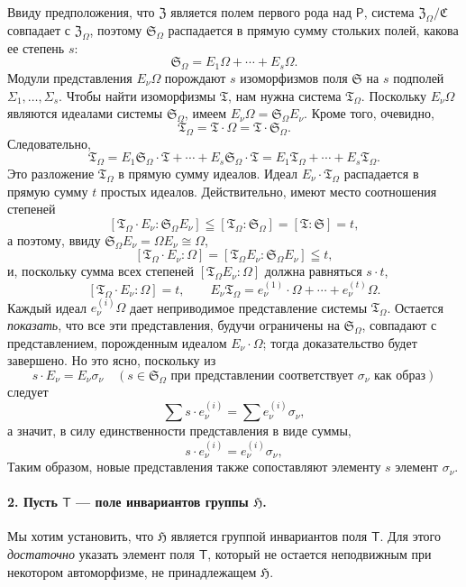 \documentclass[11pt]{article}
\begin{document}
Ввиду предположения, что \(\mathfrak Z\) является полем первого рода над \(\mathsf P\), система \(\mathfrak Z_\Omega/\mathfrak C\) совпадает с \(\mathfrak Z_\Omega\), поэтому \(\mathfrak S_\Omega\) распадается в прямую сумму стольких полей, какова ее степень \(s\):
\[
\mathfrak S_\Omega = E_1\Omega+\cdots+E_s\Omega .
\]
Модули представления \(E_\nu\Omega\) порождают \(s\) изоморфизмов поля \(\mathfrak S\) на \(s\) подполей \(\Sigma_1,\ldots,\Sigma_s\). Чтобы найти изоморфизмы \(\mathfrak T\), нам нужна система \(\mathfrak T_\Omega\). Поскольку \(E_\nu\Omega\) являются идеалами системы \(\mathfrak S_\Omega\), имеем \(E_\nu\Omega=\mathfrak S_\Omega E_\nu\). Кроме того, очевидно,
\[
\mathfrak T_\Omega=\mathfrak T\cdot\Omega=\mathfrak T\cdot\mathfrak S_\Omega .
\]
Следовательно,
\[
\mathfrak T_\Omega
=E_1\mathfrak S_\Omega\cdot\mathfrak T+\cdots+E_s\mathfrak S_\Omega\cdot\mathfrak T
=E_1\mathfrak T_\Omega+\cdots+E_s\mathfrak T_\Omega .
\]
Это разложение \(\mathfrak T_\Omega\) в прямую сумму идеалов. Идеал \(E_\nu\cdot\mathfrak T_\Omega\) распадается в прямую сумму \(t\) простых идеалов. Действительно, имеют место соотношения степеней
\[
[\mathfrak T_\Omega\cdot E_\nu:\mathfrak S_\Omega E_\nu]
\leqq [\mathfrak T_\Omega:\mathfrak S_\Omega]=[\mathfrak T:\mathfrak S]=t,
\]
а поэтому, ввиду \(\mathfrak S_\Omega E_\nu=\Omega E_\nu\cong\Omega\),
\[
[\mathfrak T_\Omega\cdot E_\nu:\Omega]
=[\mathfrak T_\Omega E_\nu:\mathfrak S_\Omega E_\nu]\leqq t,
\]
и, поскольку сумма всех степеней \([\mathfrak T_\Omega E_\nu:\Omega]\) должна равняться \(s\cdot t\),
\[
[\mathfrak T_\Omega\cdot E_\nu:\Omega]=t,\qquad
E_\nu\mathfrak T_\Omega=e_\nu^{(1)}\cdot\Omega+\cdots+e_\nu^{(t)}\Omega .
\]
Каждый идеал \(e_\nu^{(i)}\Omega\) дает неприводимое представление системы \(\mathfrak T_\Omega\). Остается \emph{показать}, что все эти представления, будучи ограничены на \(\mathfrak S_\Omega\), совпадают с представлением, порожденным идеалом \(E_\nu\cdot\Omega\); тогда доказательство будет завершено. Но это ясно, поскольку из
\[
s\cdot E_\nu=E_\nu\sigma_\nu\quad
(s\in\mathfrak S_\Omega\text{ при представлении соответствует }\sigma_\nu\text{ как образ})
\]
следует
\[
\sum s\cdot e_\nu^{(i)}=\sum e_\nu^{(i)}\sigma_\nu,
\]
а значит, в силу единственности представления в виде суммы,
\[
s\cdot e_\nu^{(i)}=e_\nu^{(i)}\sigma_\nu,
\]
Таким образом, новые представления также сопоставляют элементу \(s\) элемент \(\sigma_\nu\).

\paragraph{2. Пусть \(\mathsf T\) --- поле инвариантов группы \(\mathfrak H\).}
Мы хотим установить, что \(\mathfrak H\) является группой инвариантов поля \(\mathsf T\). Для этого \emph{достаточно} указать элемент поля \(\mathsf T\), который не остается неподвижным при некотором автоморфизме, не принадлежащем \(\mathfrak H\).
\end{document}

